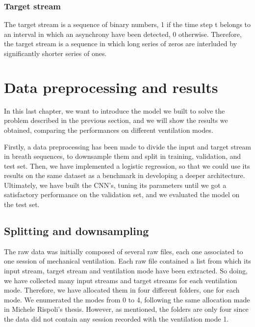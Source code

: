 \documentclass[a4paper, twoside]{article}
\begin{document}
    \subsubsection{Target stream}
    The target stream is a sequence of binary numbers, 1 if the time step t belongs to an interval in which an asynchrony have been detected, 0 otherwise. Therefore, the target stream is a sequence in which long series of zeros are interluded by significantly shorter series of ones.





















\newpage
\section{Data preprocessing and results}

    In this last chapter, we want to introduce the model we built to solve the problem described in the previous section, and we will show the results we obtained, comparing the performances on different ventilation modes.

    Firstly, a data preprocessing has been made to divide the input and target stream in breath sequences, to downsample them and split in training, validation, and test set.
    Then, we have implemented a logistic regression, so that we could use its results on the same dataset as a benchmark in developing a deeper architecture.
    Ultimately, we have built the CNN's, tuning its parameters until we got a satisfactory performance on the validation set, and we evaluated the model on the test set.

    \subsection{Splitting and downsampling}

        The raw data was initially composed of several raw files, each one associated to one session of mechanical ventilation. Each raw file contained a list from which its input stream, target stream and ventilation mode have been extracted. So doing, we have collected many input streams and target streams for each ventilation mode. Therefore, we have allocated them in four different folders, one for each mode. We enumerated the modes from 0 to 4, following the same allocation made in Michele Rispoli's thesis. However, as mentioned, the folders are only four since the data did not contain any session recorded with the ventilation mode 1.
\end{document}
